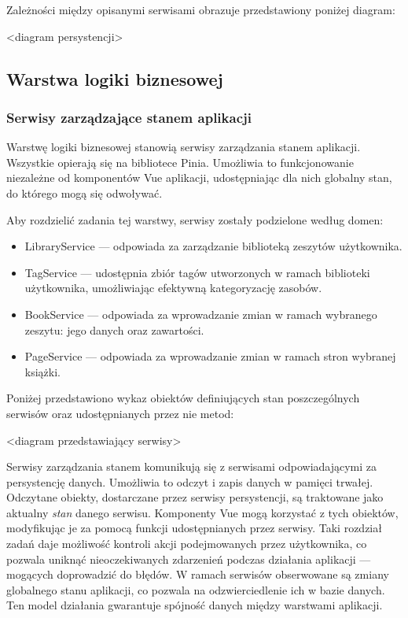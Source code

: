 Zależności między opisanymi serwisami obrazuje przedstawiony poniżej diagram:

<diagram persystencji>

\subsection{Warstwa logiki biznesowej}
\subsubsection{Serwisy zarządzające stanem aplikacji}
Warstwę logiki biznesowej stanowią serwisy zarządzania stanem aplikacji.
Wszystkie opierają się na bibliotece Pinia.
Umożliwia to funkcjonowanie niezależne od komponentów Vue aplikacji, udostępniając dla nich globalny stan,
do którego mogą się odwoływać.

Aby rozdzielić zadania tej warstwy, serwisy zostały podzielone według domen:
\begin{itemize}
	\item LibraryService — odpowiada za zarządzanie biblioteką zeszytów użytkownika.
	\item TagService — udostępnia zbiór tagów utworzonych w ramach biblioteki użytkownika, umożliwiając efektywną kategoryzację zasobów.
	\item BookService — odpowiada za wprowadzanie zmian w ramach wybranego zeszytu: jego danych oraz zawartości.
	\item PageService — odpowiada za wprowadzanie zmian w ramach stron wybranej książki.
\end{itemize}

Poniżej przedstawiono wykaz obiektów definiujących stan poszczególnych serwisów oraz udostępnianych przez nie metod:

<diagram przedstawiający serwisy>

Serwisy zarządzania stanem komunikują się z serwisami odpowiadającymi za persystencję danych.
Umożliwia to odczyt i zapis danych w pamięci trwałej. Odczytane obiekty, dostarczane przez serwisy persystencji,
są traktowane jako aktualny \textit{stan} danego serwisu.
Komponenty Vue mogą korzystać z tych obiektów, modyfikując je za pomocą funkcji udostępnianych przez serwisy.
Taki rozdział zadań daje możliwość kontroli akcji podejmowanych przez użytkownika, co pozwala uniknąć nieoczekiwanych
zdarzenień podczas działania aplikacji — mogących doprowadzić do błędów.
W ramach serwisów obserwowane są zmiany globalnego stanu aplikacji, co pozwala na odzwierciedlenie ich w bazie danych.
Ten model działania gwarantuje spójność danych między warstwami aplikacji.


